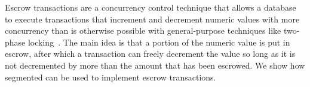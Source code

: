 %

Escrow transactions are a concurrency control technique that allows a database
to execute transactions that increment and decrement numeric values with more
concurrency than is otherwise possible with general-purpose techniques like
two-phase locking~\cite{o1986escrow}. The main idea is that a portion of the
numeric value is put in escrow, after which a transaction can freely decrement
the value so long as it is not decremented by more than the amount that has
been escrowed. We show how segmented \invariantconfluence{} can be used to
implement escrow transactions.

